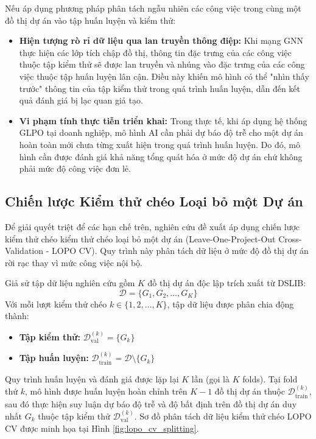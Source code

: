 Nếu áp dụng phương pháp phân tách ngẫu nhiên các công việc trong cùng một đồ thị dự án vào tập huấn luyện và kiểm thử:
\begin{itemize}
    \item \textbf{Hiện tượng rò rỉ dữ liệu qua lan truyền thông điệp:} Khi mạng GNN thực hiện các lớp tích chập đồ thị, thông tin đặc trưng của các công việc thuộc tập kiểm thử sẽ được lan truyền và nhúng vào đặc trưng của các công việc thuộc tập huấn luyện lân cận. Điều này khiến mô hình có thể "nhìn thấy trước" thông tin của tập kiểm thử trong quá trình huấn luyện, dẫn đến kết quả đánh giá bị lạc quan giả tạo.
    \item \textbf{Vi phạm tính thực tiễn triển khai:} Trong thực tế, khi áp dụng hệ thống GLPO tại doanh nghiệp, mô hình AI cần phải dự báo độ trễ cho một dự án hoàn toàn mới chưa từng xuất hiện trong quá trình huấn luyện. Do đó, mô hình cần được đánh giá khả năng tổng quát hóa ở mức độ dự án chứ không phải mức độ công việc đơn lẻ.
\end{itemize}

\subsection{Chiến lược Kiểm thử chéo Loại bỏ một Dự án}
Để giải quyết triệt để các hạn chế trên, nghiên cứu đề xuất áp dụng chiến lược kiểm thử chéo kiểm thử chéo loại bỏ một dự án (Leave-One-Project-Out Cross-Validation - LOPO CV). Quy trình này phân tách dữ liệu ở mức độ đồ thị dự án rời rạc thay vì mức công việc nội bộ.

Giả sử tập dữ liệu nghiên cứu gồm $K$ đồ thị dự án độc lập trích xuất từ DSLIB:
$$\mathcal{D} = \{G_1, G_2, \dots, G_K\}$$
Với mỗi lượt kiểm thử chéo $k \in \{1, 2, \dots, K\}$, tập dữ liệu được phân chia động thành:
\begin{itemize}
    \item \textbf{Tập kiểm thử:} $\mathcal{D}_{\text{val}}^{(k)} = \{G_k\}$
    \item \textbf{Tập huấn luyện:} $\mathcal{D}_{\text{train}}^{(k)} = \mathcal{D} \setminus \{G_k\}$
\end{itemize}

Quy trình huấn luyện và đánh giá được lặp lại $K$ lần (gọi là $K$ folds). Tại fold thứ $k$, mô hình được huấn luyện hoàn chỉnh trên $K-1$ đồ thị dự án thuộc $\mathcal{D}_{\text{train}}^{(k)}$, sau đó thực hiện suy luận dự báo độ trễ và độ bất định trên đồ thị dự án duy nhất $G_k$ thuộc tập kiểm thử $\mathcal{D}_{\text{val}}^{(k)}$. Sơ đồ phân tách dữ liệu kiểm thử chéo LOPO CV được minh họa tại Hình \ref{fig:lopo_cv_splitting}.


